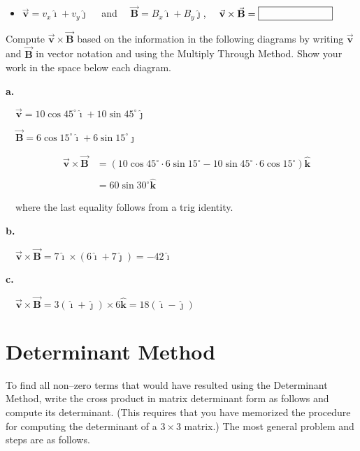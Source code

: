 \documentclass{article}
\newcommand{\ihat}[0]{\hat{\boldsymbol{\imath}}}
\newcommand{\jhat}[0]{\hat{\boldsymbol{\jmath}}}
\newcommand{\khat}[0]{\hat{\boldsymbol{k}}}
\newcommand{\bfvec}[1]{\vec{\mathbf{#1}}}
\begin{document}
    \begin{itemize}

      \item $\bfvec{v}=v_x\ihat+v_y\jhat\quad$ and $\quad\bfvec{B}=B_x\ihat+B_y\jhat$, $\quad\bfvec{v}\times\bfvec{B} = \fbox{\qquad\qquad\qquad\phantom M}$

    \end{itemize}
\fi

\vskip 0.75pt

Compute $\bfvec{v}\times\bfvec{B}$ based on the information in the following diagrams by writing $\bfvec{v}$ and $\bfvec{B}$ in vector notation and using the Multiply Through Method. Show your work in the space below each diagram.



\ifsolutions
\textbf{a.}

$\quad\bfvec{v}=10\cos 45^\circ\ihat + 10\sin 45^\circ\jhat$

$\quad\bfvec{B}=6\cos 15^\circ\ihat + 6\sin 15^\circ\jhat$

$$
\begin{align*}
\quad\bfvec{v}\times\bfvec{B} &= (10\cos 45^\circ \cdot 6\sin 15^\circ-10\sin 45^\circ \cdot 6\cos 15^\circ)\khat\\\\
&= 60\sin 30^\circ\khat
\end{align*}
$$

$\quad$where the last equality follows from a trig identity.

\textbf{b.}

$\quad\bfvec{v}\times\bfvec{B} = 7\ihat \times (6\ihat + 7\jhat) = -42\ihat$

\textbf{c.}

$\quad\bfvec{v}\times\bfvec{B} =3(\ihat+\jhat)\times 6\khat = 18(\ihat - \jhat)$
\else

\newpage
\fi

\section{Determinant Method}

To find all non--zero terms that would have resulted using the Determinant Method, write the cross product in matrix determinant form as follows and compute its determinant. (This requires that you have memorized the procedure for computing the determinant of a $3\times 3$ matrix.) The most general problem and steps are as follows.
\end{document}
